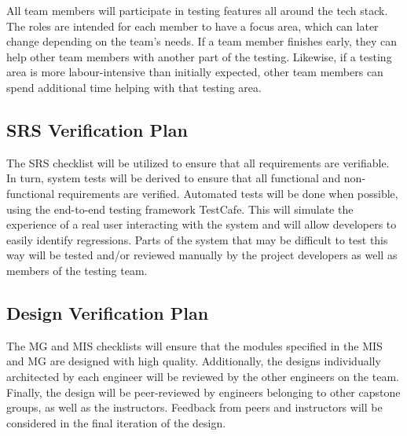 \documentclass[12pt, titlepage]{article}
\begin{document}
All team members will participate in testing features all around the tech stack. The roles are intended for each member to have a focus area, which can later change depending on the team's needs. If a team member finishes early, they can help other team members with another part of the testing. Likewise, if a testing area is more labour-intensive than initially expected, other team members can spend additional time helping with that testing area.

\subsection{SRS Verification Plan}

The SRS checklist will be utilized to ensure that all requirements are verifiable. In turn, system tests will be derived to ensure that all functional and non-functional requirements are verified. Automated tests will be done when possible, using the end-to-end testing framework TestCafe. This will simulate the experience of a real user interacting with the system and will allow developers to easily identify regressions. Parts of the system that may be difficult to test this way will be tested and/or reviewed manually by the project developers as well as members of the testing team.


\subsection{Design Verification Plan}

The MG and MIS checklists will ensure that the modules specified in the MIS and MG are designed with high quality. Additionally, the designs individually architected by each engineer will be reviewed by the other engineers on the team. Finally, the design will be peer-reviewed by engineers belonging to other capstone groups, as well as the instructors. Feedback from peers and instructors will be considered in the final iteration of the design.



\end{document}
